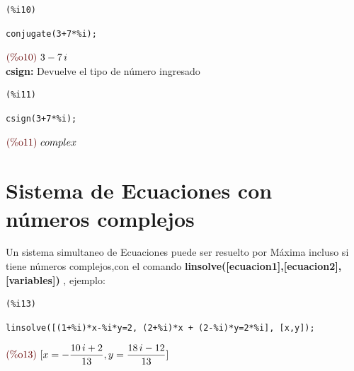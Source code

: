 \documentclass[10pt,a4paper]{book}
\begin{document}
\noindent
\begin{minipage}[t]{8ex}{\color{red}\bf
\begin{verbatim}
(%i10) 
\end{verbatim}}
\end{minipage}
\begin{minipage}[t]{\textwidth}{\color{blue}
\begin{verbatim}
conjugate(3+7*%i);
\end{verbatim}}
\end{minipage}
\begin{math}\displaystyle
\parbox{8ex}{\color{labelcolor}(\%o10) }
3-7\,i
\end{math}
\\ \textbf{csign: } Devuelve el tipo de número ingresado

\noindent
\begin{minipage}[t]{8ex}{\color{red}\bf
\begin{verbatim}
(%i11) 
\end{verbatim}}
\end{minipage}
\begin{minipage}[t]{\textwidth}{\color{blue}
\begin{verbatim}
csign(3+7*%i);
\end{verbatim}}
\end{minipage}
\begin{math}\displaystyle
\parbox{8ex}{\color{labelcolor}(\%o11) }
complex
\end{math}

\section{Sistema de Ecuaciones con números complejos}
Un sistema simultaneo de Ecuaciones puede ser resuelto por Máxima incluso si tiene números complejos,con el comando \textbf{linsolve([ecuacion1],[ecuacion2], [variables])} , ejemplo: \\

\noindent
\begin{minipage}[t]{8ex}{\color{red}\bf
\begin{verbatim}
(%i13) 
\end{verbatim}}
\end{minipage}
\begin{minipage}[t]{\textwidth}{\color{blue}
\begin{verbatim}
linsolve([(1+%i)*x-%i*y=2, (2+%i)*x + (2-%i)*y=2*%i], [x,y]);
\end{verbatim}}
\end{minipage}
\begin{math}\displaystyle
\parbox{8ex}{\color{labelcolor}(\%o13) }
[x=-\frac{10\,i+2}{13},y=\frac{18\,i-12}{13}]
\end{math}
\end{document}
